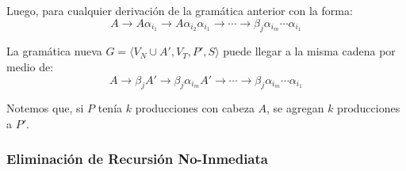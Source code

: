 Luego, para cualquier derivación de la gramática anterior con la forma:
$$
    A \to A \alpha_{i_1} \to A \alpha_{i_2} \alpha_{i_1} \to \cdots \to \beta_j \alpha_{i_m} \cdots \alpha_{i_1}
$$

La gramática nueva $G = \langle V_N \cup A', V_T, P', S \rangle$ puede llegar a la misma cadena por medio de:
$$
    A \to \beta_j A' \to \beta_j \alpha_{i_m} A' \to \cdots \to \beta_j \alpha_{i_m} \cdots \alpha_{i_1}
$$

Notemos que, si $P$ tenía $k$ producciones con cabeza $A$, se agregan $k$ producciones a $P'$.

\subsubsection{Eliminación de Recursión No-Inmediata}


